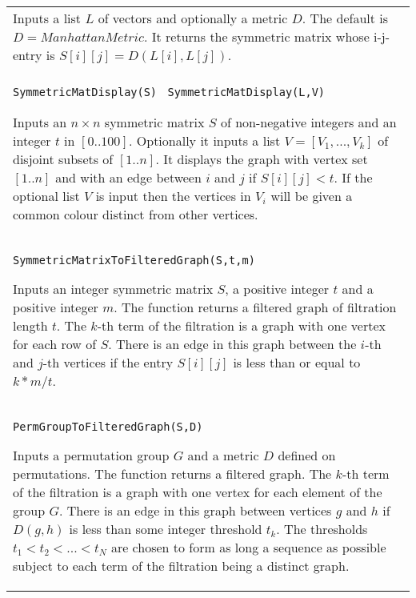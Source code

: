 \documentclass[a4paper,11pt]{report}
\begin{document}
{\begin{center}
\begin{tabular}{|l|}
 Inputs a list $L$ of vectors and optionally a metric $D$. The default is $D=ManhattanMetric$. It returns the symmetric matrix whose i-j-entry is $S[i][j]=D(L[i],L[j])$. \\
 \index{SymmetricMatDisplay} \texttt{SymmetricMatDisplay(S) } \texttt{SymmetricMatDisplay(L,V) } 

 Inputs an $n \times n$ symmetric matrix $S$ of non-negative integers and an integer $t$ in $[0 .. 100]$. Optionally it inputs a list $V=[V_1, ... , V_k]$ of disjoint subsets of $[1 .. n]$. It displays the graph with vertex set $[1 .. n]$ and with an edge between $i$ and $j$ if $S[i][j] < t$. If the optional list $V$ is input then the vertices in $V_i$ will be given a common colour distinct from other vertices. \\
 \index{SymmetricMatrixToFilteredGraph} \texttt{SymmetricMatrixToFilteredGraph(S,t,m) } 

 Inputs an integer symmetric matrix $S$, a positive integer $t$ and a positive integer $m$. The function returns a filtered graph of filtration length $t$. The $k$-th term of the filtration is a graph with one vertex for each row of $S$. There is an edge in this graph between the $i$-th and $j$-th vertices if the entry $S[i][j]$ is less than or equal to $k*m/t$. \\
 \index{PermGroupToFilteredGraph} \texttt{PermGroupToFilteredGraph(S,D) } 

 Inputs a permutation group $G$ and a metric $D$ defined on permutations. The function returns a filtered graph. The $k$-th term of the filtration is a graph with one vertex for each element of the
group $G$. There is an edge in this graph between vertices $g$ and $h$ if $D(g,h)$ is less than some integer threshold $t_k$. The thresholds $t_1 < t_2 < ... < t_N$ are chosen to form as long a sequence as possible subject to each term of the
filtration being a distinct graph. \\
\end{tabular}\\[2mm]
\end{center}

 }

 
\end{document}
